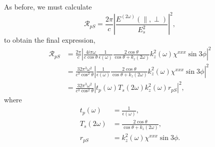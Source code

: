 As before, we must calculate
\begin{equation*}
\mathcal{R}_{pS}
= \frac{2\pi}{c}
  \left\vert\frac{E^{(2\omega)}(\parallel,\perp)}{E^{2}_{s}}\right\vert^{2},
\end{equation*}
to obtain the final expression,
\begin{align}
\mathcal{R}_{pS}
&= \frac{2\pi}{c}
   \left\vert
   \frac{4i\pi\omega}{c\cos\theta}
   \frac{1}{\epsilon(\omega)}
   \frac{2\cos\theta}{\cos\theta + k_{z}(2\omega)}
   k^{2}_{z}(\omega)\chi^{xxx}\sin3\phi
   \right\vert^{2}\nonumber\\
&= \frac{32\pi^{3}\omega^{2}}{c^{3}\cos^{2}\theta}
   \left\vert
   \frac{1}{\epsilon(\omega)}
   \frac{2\cos\theta}{\cos\theta + k_{z}(2\omega)}
   k^{2}_{z}(\omega)\chi^{xxx}\sin3\phi
   \right\vert^{2}\nonumber\\
&= \frac{32\pi^{3}\omega^{2}}{c^{3}\cos^{2}\theta}
  \left\vert t_{p}(\omega)T_{s}(2\omega)k^{2}_{z}(\omega)r_{pS}\right\vert^{2},
  \label{RpS}
\end{align}
where
\begin{equation*}
\begin{split}
t_{p}(\omega)
&= \frac{1}{\epsilon(\omega)},\\
T_{s}(2\omega)
&= \frac{2\cos\theta}{\cos\theta + k_{z}(2\omega)},\\
r_{pS} &= k^{2}_{z}(\omega)\chi^{xxx}\sin3\phi.
\end{split}
\end{equation*}


